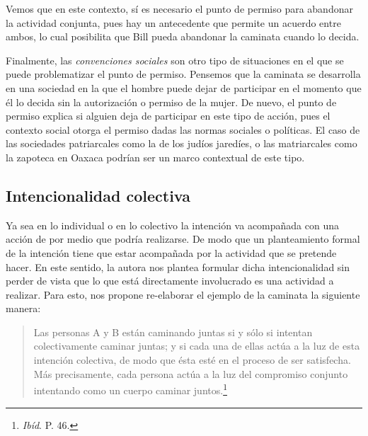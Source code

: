 \documentclass[oneside]{book}
\begin{document}
Vemos que en este contexto, sí es necesario el punto de permiso para abandonar la actividad conjunta, pues hay un antecedente que permite un acuerdo entre ambos, lo cual posibilita que Bill pueda abandonar la caminata cuando lo decida.

Finalmente, las \textit{convenciones sociales} son otro tipo de situaciones en el que se puede problematizar el punto de permiso. Pensemos que la caminata se desarrolla en una sociedad en la que el hombre puede dejar de participar en el momento que él lo decida sin la autorización o permiso de la mujer. De nuevo, el punto de permiso explica si alguien deja de participar en este tipo de acción, pues el contexto social otorga el permiso dadas las normas sociales o políticas. El caso de las sociedades patriarcales como la de los judíos jaredíes, o las matriarcales como la zapoteca en Oaxaca podrían ser un marco contextual de este tipo.

\subsection{Intencionalidad colectiva}



Ya sea en lo individual o en lo colectivo la intención va acompañada con una acción de por medio que podría realizarse. De modo que un planteamiento formal de la intención tiene que estar acompañada por la actividad que se pretende hacer. En este sentido, la autora nos plantea formular dicha intencionalidad sin perder de vista que lo que está directamente involucrado es una actividad a realizar. Para esto, nos propone re-elaborar el ejemplo de la caminata la siguiente manera:

\begin{quote}
Las personas A y B están caminando juntas si y sólo si intentan colectivamente caminar juntas; y si cada una de ellas actúa a la luz de esta intención colectiva, de modo que ésta esté en el proceso de ser satisfecha. Más precisamente, cada persona actúa a la luz del compromiso conjunto intentando como un cuerpo caminar juntos.\footnote{\textit{Ibíd}. P. 46.} 
\end{quote}
\end{document}
